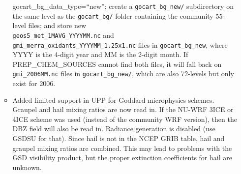 \begin{itemize}
\begin{itemize}
      gocart\_bg\_data\_type=``new''; create a \texttt{gocart\_bg\_new/}
      subdirectory on the same level as the \texttt{gocart\_bg/} folder 
      containing the community 55-level files; and store new\\
      \texttt{geos5\_met\_1MAVG\_YYYYMM.nc} and 
      \texttt{gmi\_merra\_oxidants\_YYYYMM\_1.25x1.nc} files in
      \texttt{gocart\_bg\_new}, where YYYY is the 4-digit year and MM is the
      2-digit month. If PREP\_CHEM\_SOURCES cannot find both files, it will
      fall back on \texttt{gmi\_2006MM.nc} files in \texttt{gocart\_bg\_new/}, 
      which are also 72-levels but only exist for 2006.
    \item Added limited support in UPP for Goddard microphysics schemes. 
      Graupel and hail mixing ratios are now read in. If the NU-WRF 3ICE or
      4ICE scheme was used (instead of the community WRF version), then the
      DBZ field will also be read in. Radiance generation is disabled (use
      GSDSU for that). Since hail is not in the NCEP GRIB table, hail and
      graupel mixing ratios are combined. This may lead to problems with the
      GSD visibility product, but the proper extinction coefficients for hail
      are unknown.
  \end{itemize}


\end{itemize}
